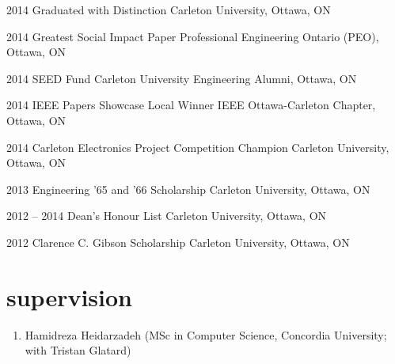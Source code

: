 \documentclass[]{friggeri-cv} %
\begin{document}
\begin{entrylist}
\entry
{2014}
{Graduated with Distinction}
{Carleton University, Ottawa, ON}
{}
\vspace{-7pt}

\entry
{2014}
{Greatest Social Impact Paper}
{Professional Engineering Ontario (PEO), Ottawa, ON}
{}
\vspace{-7pt}

\entry
{2014}
{SEED Fund}
{Carleton University Engineering Alumni, Ottawa, ON}
{}
\vspace{-7pt}

\entry
{2014}
{IEEE Papers Showcase Local Winner}
{IEEE Ottawa-Carleton Chapter, Ottawa, ON}
{}
\vspace{-7pt}

\entry
{2014}
{Carleton Electronics Project Competition Champion}
{Carleton University, Ottawa, ON}
{}
\vspace{-7pt}

\entry
{2013}
{Engineering '65 and '66 Scholarship}
{Carleton University, Ottawa, ON}
{}
\vspace{-7pt}

\entry
{2012 -- 2014}
{Dean's Honour List}
{Carleton University, Ottawa, ON}
{}
\vspace{-7pt}

\entry
{2012}
{Clarence C. Gibson Scholarship}
{Carleton University, Ottawa, ON}
{}
\vspace{-7pt}
\end{entrylist}

\section{supervision}
\begin{enumerate}
\item Hamidreza Heidarzadeh (MSc in Computer Science, Concordia University; with Tristan Glatard)
\end{enumerate}
\end{document}

